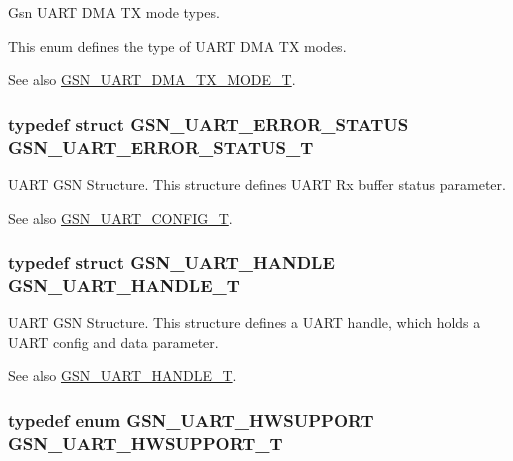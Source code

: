 Gsn UART DMA TX mode types. 

This enum defines the type of UART DMA TX modes. \begin{DoxySeeAlso}{See also}
\hyperlink{a00656_gaca97ddd99d6a776d3991457a1113f687}{GSN\_\-UART\_\-DMA\_\-TX\_\-MODE\_\-T}. 
\end{DoxySeeAlso}
\hypertarget{a00656_ga5129250d6cc2cf041ba60eeb792ea834}{
\subsubsection[{GSN\_\-UART\_\-ERROR\_\-STATUS\_\-T}]{\setlength{\rightskip}{0pt plus 5cm}typedef struct {\bf GSN\_\-UART\_\-ERROR\_\-STATUS} {\bf GSN\_\-UART\_\-ERROR\_\-STATUS\_\-T}}}
\label{a00656_ga5129250d6cc2cf041ba60eeb792ea834}


UART GSN Structure. This structure defines UART Rx buffer status parameter. 

\begin{DoxySeeAlso}{See also}
\hyperlink{a00656_gab793201a4cc37e8cf27b0b640b1f37bc}{GSN\_\-UART\_\-CONFIG\_\-T}. 
\end{DoxySeeAlso}
\hypertarget{a00656_ga1e481438503e3525aaef5eb97517e75a}{
\subsubsection[{GSN\_\-UART\_\-HANDLE\_\-T}]{\setlength{\rightskip}{0pt plus 5cm}typedef struct {\bf GSN\_\-UART\_\-HANDLE} {\bf GSN\_\-UART\_\-HANDLE\_\-T}}}
\label{a00656_ga1e481438503e3525aaef5eb97517e75a}


UART GSN Structure. This structure defines a UART handle, which holds a UART config and data parameter. 

\begin{DoxySeeAlso}{See also}
\hyperlink{a00656_ga1e481438503e3525aaef5eb97517e75a}{GSN\_\-UART\_\-HANDLE\_\-T}. 
\end{DoxySeeAlso}
\hypertarget{a00656_gaf4df97392dfefed655a81fe500a74162}{
\subsubsection[{GSN\_\-UART\_\-HWSUPPORT\_\-T}]{\setlength{\rightskip}{0pt plus 5cm}typedef enum {\bf GSN\_\-UART\_\-HWSUPPORT} {\bf GSN\_\-UART\_\-HWSUPPORT\_\-T}}}
\label{a00656_gaf4df97392dfefed655a81fe500a74162}


